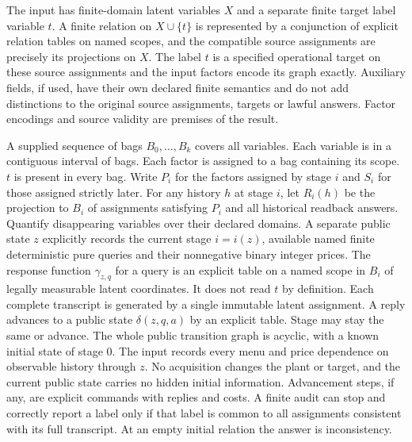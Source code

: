 \begin{theorem}\label{ext:m021}

The input has finite-domain latent variables \(X\) and a separate finite target label variable \(t\). A finite relation on \(X\cup\{t\}\) is represented by a conjunction of explicit relation tables on named scopes, and the compatible source assignments are precisely its projections on \(X\). The label \(t\) is a specified operational target on these source assignments and the input factors encode its graph exactly. Auxiliary fields, if used, have their own declared finite semantics and do not add distinctions to the original source assignments, targets or lawful answers. Factor encodings and source validity are premises of the result.

A supplied sequence of bags \(B_0,\dots,B_k\) covers all variables. Each variable is in a contiguous interval of bags. Each factor is assigned to a bag containing its scope. \(t\) is present in every bag. Write \(P_i\) for the factors assigned by stage \(i\) and \(S_i\) for those assigned strictly later. For any history \(h\) at stage \(i\), let \(R_i(h)\) be the projection to \(B_i\) of assignments satisfying \(P_i\) and all historical readback answers. Quantify disappearing variables over their declared domains. A separate public state \(z\) explicitly records the current stage \(i=i(z)\), available named finite deterministic pure queries and their nonnegative binary integer prices. The response function \(\gamma_{z,q}\) for a query is an explicit table on a named scope in \(B_i\) of legally measurable latent coordinates. It does not read \(t\) by definition. Each complete transcript is generated by a single immutable latent assignment. A reply advances to a public state \(\delta(z,q,a)\) by an explicit table. Stage may stay the same or advance. The whole public transition graph is acyclic, with a known initial state of stage \(0\). The input records every menu and price dependence on observable history through \(z\). No acquisition changes the plant or target, and the current public state carries no hidden initial information. Advancement steps, if any, are explicit commands with replies and costs. A finite audit can stop and correctly report a label only if that label is common to all assignments consistent with its full transcript. At an empty initial relation the answer is inconsistency.


\end{theorem}
